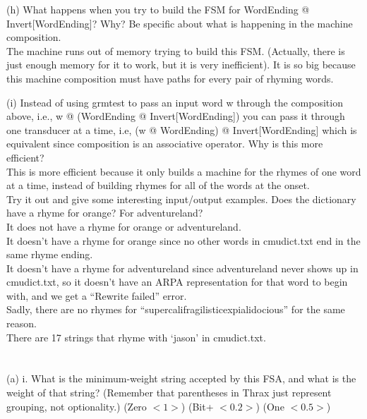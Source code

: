 \documentclass[11pt]{article} %
\begin{document}
(h) What happens when you try to build the FSM for WordEnding @ Invert[WordEnding]? Why? Be specific about what is happening in the machine composition.\\

The machine runs out of memory trying to build this FSM. (Actually, there is just enough memory for it to work, but it is very inefficient). It is so big because this machine composition must have paths for every pair of rhyming words.\\

\newpage

(i) Instead of using grmtest to pass an input word w through the composition above, i.e., w @ (WordEnding @ Invert[WordEnding]) you can pass it through one transducer at a time, i.e, (w @ WordEnding) @ Invert[WordEnding] which is equivalent since composition is an associative operator. Why is this more efficient?\\

This is more efficient because it only builds a machine for the rhymes of one word at a time, instead of building rhymes for all of the words at the onset.\\

Try it out and give some interesting input/output examples. Does the dictionary have a rhyme for orange? For adventureland? \\
It does not have a rhyme for orange or adventureland.\\

It doesn’t have a rhyme for orange since no other words in cmudict.txt end in the same rhyme ending.\\

It doesn’t have a rhyme for adventureland since adventureland never shows up in cmudict.txt, so it doesn’t have an ARPA representation for that word to begin with, and we get a ``Rewrite failed” error.\\

Sadly, there are no rhymes for ``supercalifragilisticexpialidocious” for the same reason.\\

There are 17 strings that rhyme with ‘jason’ in cmudict.txt.\\

\newpage

\section{}

(a) i. What is the minimum-weight string accepted by this FSA, and what is the weight of that string? (Remember that parentheses in Thrax just represent grouping, not optionality.) (Zero $<1>$) (Bit+ $<0.2>$) (One $<0.5>$)\\
\end{document}
